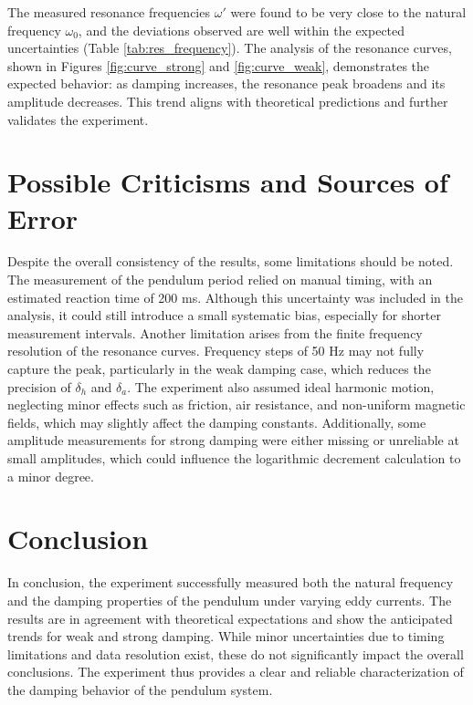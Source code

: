 The measured resonance frequencies $\omega'$ were found to be very close to the natural frequency $\omega_0$, and the deviations observed are well within the expected uncertainties (Table \ref{tab:res_frequency}). The analysis of the resonance curves, shown in Figures \ref{fig:curve_strong} and \ref{fig:curve_weak}, demonstrates the expected behavior: as damping increases, the resonance peak broadens and its amplitude decreases. This trend aligns with theoretical predictions and further validates the experiment.

\section*{Possible Criticisms and Sources of Error}
Despite the overall consistency of the results, some limitations should be noted. The measurement of the pendulum period relied on manual timing, with an estimated reaction time of 200 ms. Although this uncertainty was included in the analysis, it could still introduce a small systematic bias, especially for shorter measurement intervals. Another limitation arises from the finite frequency resolution of the resonance curves. Frequency steps of 50 Hz may not fully capture the peak, particularly in the weak damping case, which reduces the precision of $\delta_h$ and $\delta_a$. The experiment also assumed ideal harmonic motion, neglecting minor effects such as friction, air resistance, and non-uniform magnetic fields, which may slightly affect the damping constants. Additionally, some amplitude measurements for strong damping were either missing or unreliable at small amplitudes, which could influence the logarithmic decrement calculation to a minor degree.

\section*{Conclusion}
In conclusion, the experiment successfully measured both the natural frequency and the damping properties of the pendulum under varying eddy currents. The results are in agreement with theoretical expectations and show the anticipated trends for weak and strong damping. While minor uncertainties due to timing limitations and data resolution exist, these do not significantly impact the overall conclusions. The experiment thus provides a clear and reliable characterization of the damping behavior of the pendulum system.
